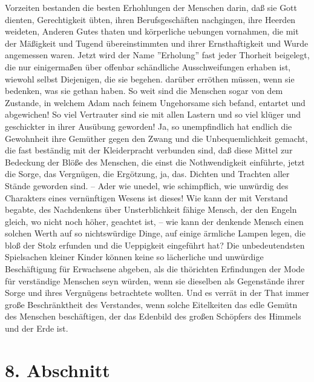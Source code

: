 Vorzeiten bestanden die besten Erhohlungen der Menschen darin, daß sie Gott dienten, Gerechtigkeit übten, ihren Berufsgeschäften nachgingen, ihre Heerden weideten, Anderen Gutes thaten und körperliche uebungen vornahmen, die mit der Mäßigkeit und Tugend übereinstimmten und ihrer Ernsthaftigkeit und Wurde angemessen waren. Jetzt wird der Name ''Erholung'' fast jeder Thorheit beigelegt, die nur einigermaßen über offenbar schändliche Ausschweifungen erhaben ist, wiewohl selbst Diejenigen, die sie begehen. darüber erröthen müssen, wenn sie bedenken, was sie gethan haben. So weit sind die Menschen sogar von dem Zustande, in welchem Adam nach feinem Ungehorsame sich befand, entartet und abgewichen! So viel Vertrauter sind sie mit allen Lastern und so viel klüger und geschickter in ihrer Ausübung geworden! Ja, so unempfindlich hat endlich die Gewohnheit ihre Gemüther gegen den Zwang und die Unbequemlichkeit gemacht, die fast beständig mit der Kleiderpracht verbunden sind, daß diese Mittel zur Bedeckung der Blöße des Menschen, die einst die Nothwendigkeit einführte, jetzt die Sorge, das Vergnügen, die Ergötzung, ja, das. Dichten und Trachten aller Stände geworden sind. -- Ader wie unedel, wie schimpflich, wie unwürdig des Charakters eines vernünftigen Wesens ist dieses! Wie kann der mit Verstand begabte, des Nachdenkens über Unsterblichkeit fähige Mensch, der den Engeln gleich, wo nicht noch höher, geachtet ist, -- wie kann der denkende Mensch einen solchen Werth auf so nichtswürdige Dinge, auf einige ärmliche Lampen legen, die bloß der Stolz erfunden und die Ueppigkeit eingeführt hat? Die unbedeutendsten Spielsachen kleiner Kinder können keine so lächerliche und unwürdige Beschäftigung für Erwachsene abgeben, als die thörichten Erfindungen der Mode für verständige Menschen seyn würden, wenn sie dieselben als Gegenstände ihrer Sorge und ihres Vergnügens betrachtete wollten. Und es verrät in der That immer große Beschränktheit des Verstandes, wenn solche Eitelkeiten das edle Gemütn des Menschen beschäftigen, der das Edenbild des großen Schöpfers des Himmels und der Erde ist.

\section{8. Abschnitt}

